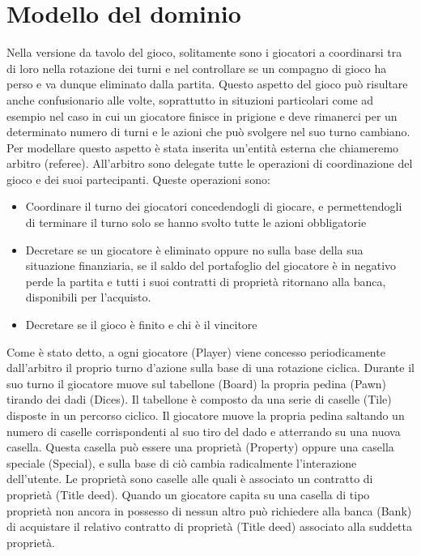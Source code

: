 \section{Modello del dominio}
Nella versione da tavolo del gioco, solitamente sono i giocatori a coordinarsi tra di loro
nella rotazione dei turni e nel controllare se un compagno di gioco ha perso e va dunque eliminato dalla partita.
Questo aspetto del gioco può risultare anche confusionario alle volte, soprattutto in situzioni particolari come ad esempio
nel caso in cui un giocatore finisce in prigione e deve rimanerci per un determinato numero di turni e le azioni che può
svolgere nel suo turno cambiano. 
Per modellare questo aspetto è stata inserita un'entità esterna che chiameremo arbitro (referee). All'arbitro sono delegate
tutte le operazioni di coordinazione del gioco e dei suoi partecipanti. 
Queste operazioni sono:
\begin{itemize}
    \item
    Coordinare il turno dei giocatori concedendogli di giocare, e permettendogli di terminare il turno solo se hanno svolto tutte le
    azioni obbligatorie
    \item 
    Decretare se un giocatore è eliminato oppure no sulla base della sua situazione finanziaria,
    se il saldo del portafoglio del giocatore è in negativo perde la partita e tutti i suoi contratti di proprietà
    ritornano alla banca, disponibili per l’acquisto. 
    \item
    Decretare se il gioco è finito e chi è il vincitore
\end{itemize}
Come è stato detto, a ogni giocatore (Player) viene concesso periodicamente dall'arbitro il proprio turno d’azione sulla base di una rotazione ciclica.
Durante il suo turno il giocatore muove sul tabellone (Board) la propria pedina (Pawn) tirando dei dadi (Dices).
Il tabellone è composto da una serie di caselle (Tile) disposte in un percorso ciclico. Il giocatore muove la propria pedina saltando 
un numero di caselle corrispondenti al suo tiro del dado e atterrando su una nuova casella. 
Questa casella può essere una proprietà (Property) oppure una casella speciale (Special), 
e sulla base di ciò cambia radicalmente l’interazione dell’utente. 
Le proprietà sono caselle alle quali è associato un contratto di proprietà (Title deed). 
Quando un giocatore capita su una casella di tipo proprietà non ancora in possesso di nessun altro può richiedere alla banca (Bank) di acquistare
il relativo contratto di proprietà (Title deed) associato alla suddetta proprietà.
